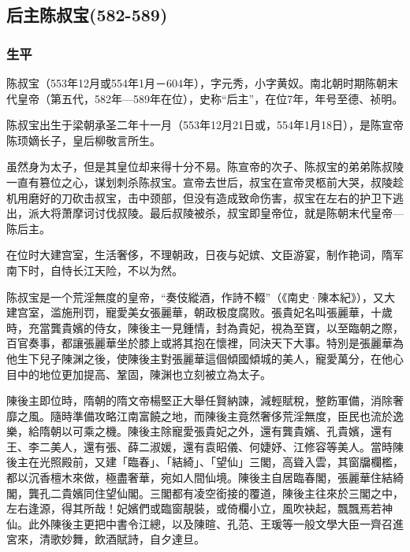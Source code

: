 
\subsection{后主陈叔宝\tiny(582-589)}

\subsubsection{生平}

陈叔宝（553年12月或554年1月－604年），字元秀，小字黄奴。南北朝时期陈朝末代皇帝（第五代，582年—589年在位），史称“后主”，在位7年，年号至德、祯明。

陈叔宝出生于梁朝承圣二年十一月（553年12月21日或，554年1月18日），是陈宣帝陈顼嫡长子，皇后柳敬言所生。

虽然身为太子，但是其皇位却来得十分不易。陈宣帝的次子、陈叔宝的弟弟陈叔陵一直有篡位之心，谋划刺杀陈叔宝。宣帝去世后，叔宝在宣帝灵柩前大哭，叔陵趁机用磨好的刀砍击叔宝，击中颈部，但没有造成致命伤害，叔宝在左右的护卫下逃出，派大将萧摩诃讨伐叔陵。最后叔陵被杀，叔宝即皇帝位，就是陈朝末代皇帝—陈后主。

在位时大建宫室，生活奢侈，不理朝政，日夜与妃嫔、文臣游宴，制作艳词，隋军南下时，自恃长江天险，不以为然。

陈叔宝是一个荒淫無度的皇帝，“奏伎縱酒，作詩不輟”（《南史·陳本紀》），又大建宫室，滥施刑罚，寵愛美女張麗華，朝政极度腐败。張貴妃名叫張麗華，十歲時，充當龔貴嬪的侍女，陳後主一見鍾情，封為貴妃，視為至寶，以至臨朝之際，百官奏事，都讓張麗華坐於膝上或將其抱在懷裡，同決天下大事。特別是張麗華為他生下兒子陳渊之後，使陳後主對張麗華這個傾國傾城的美人，寵愛萬分，在他心目中的地位更加提高、鞏固，陳渊也立刻被立為太子。

陳後主即位時，隋朝的隋文帝楊堅正大舉任賢納諫，減輕賦稅，整飭軍備，消除奢靡之風。隨時準備攻略江南富饒之地，而陳後主竟然奢侈荒淫無度，臣民也流於逸樂，給隋朝以可乘之機。陳後主除寵愛張貴妃之外，還有龔貴嬪、孔貴嬪，還有王、李二美人，還有張、薛二淑媛，還有袁昭儀、何婕妤、江修容等美人。當時陳後主在光照殿前，又建「臨春」、「結綺」、「望仙」三閣，高聳入雲，其窗牖欄檻，都以沉香檀木來做，極盡奢華，宛如人間仙境。陳後主自居臨春閣，張麗華住結綺閣，龔孔二貴嬪同住望仙閣。三閣都有凌空銜接的覆道，陳後主往來於三閣之中，左右逢源，得其所哉！妃嬪們或臨窗靚裝，或倚欄小立，風吹袂起，飄飄焉若神仙。此外陳後主更把中書令江總，以及陳暄、孔范、王瑗等一般文學大臣一齊召進宮來，清歌妙舞，飲酒賦詩，自夕達旦。

